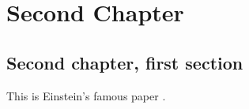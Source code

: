 \chapter{Second Chapter}
\section{Second chapter, first section}
This is Einstein's famous paper \citep{einstein05}.



